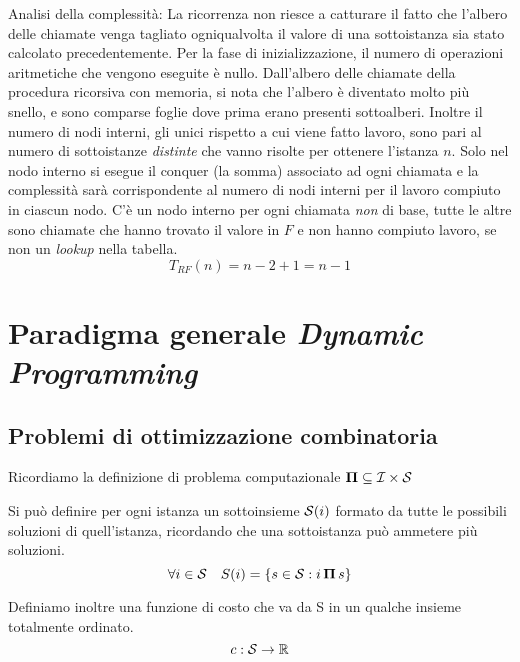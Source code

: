 Analisi della complessità:
La ricorrenza non riesce a catturare il fatto che l'albero delle chiamate venga tagliato ogniqualvolta il valore di una sottoistanza sia stato calcolato precedentemente.
Per la fase di inizializzazione, il numero di operazioni aritmetiche che vengono eseguite è nullo.
Dall'albero delle chiamate della procedura ricorsiva con memoria, si nota che l'albero è diventato molto più snello, e sono comparse foglie dove prima erano presenti sottoalberi. Inoltre il numero di nodi interni, gli unici rispetto a cui viene fatto lavoro, sono pari al numero di sottoistanze \emph{distinte} che vanno risolte per ottenere l'istanza $n$. 
Solo nel nodo interno si esegue il conquer (la somma) associato ad ogni chiamata e la complessità sarà corrispondente al numero di nodi interni per il lavoro compiuto in ciascun nodo. C'è un nodo interno per ogni chiamata \emph{non} di base, tutte le altre sono chiamate che hanno trovato il valore in $F$ e non hanno compiuto lavoro, se non un \emph{lookup} nella tabella.
\begin{equation*}
    T_{RF} (n) = n-2+1 = n-1
\end{equation*}

\section{Paradigma generale \emph{Dynamic Programming}}

\subsection{Problemi di ottimizzazione combinatoria}

Ricordiamo la definizione di problema computazionale $\bm{\Pi}{} \subseteq \mathcal{I}{} \times \mathcal{S}{}$

Si può definire per ogni istanza un sottoinsieme $\mathcal{S}{}(i)$ formato da tutte le possibili soluzioni di quell'istanza, ricordando che una sottoistanza può ammetere più soluzioni.
\begin{equation*}
    \forall i \in \mathcal{S}{} \quad S(i) = \left\{ s \in \mathcal{S}{} : i \, \bm{\Pi}{} \, s \right\}
\end{equation*}

Definiamo inoltre una funzione di costo che va da S in un qualche insieme totalmente ordinato.
\begin{equation*}
    c : \mathcal{S}{} \to \mathbb{R}
\end{equation*}

